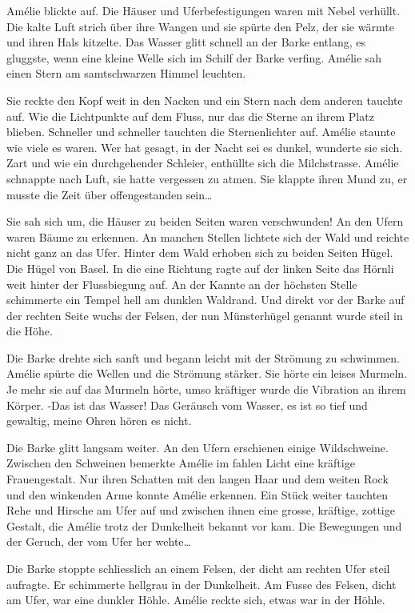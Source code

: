 \documentclass[11pt,titlepage,a5paper]{book}
\begin{document}
Amélie blickte auf. Die Häuser und Uferbefestigungen waren mit Nebel verhüllt. Die kalte Luft strich über ihre Wangen und sie spürte den Pelz, der sie wärmte und ihren Hals kitzelte. Das Wasser glitt schnell an der Barke entlang, es gluggste, wenn eine kleine Welle sich im Schilf der Barke verfing. Amélie sah einen Stern am samtschwarzen Himmel leuchten. 

Sie reckte den Kopf weit in den Nacken und ein Stern nach dem anderen tauchte auf. Wie die Lichtpunkte auf dem Fluss, nur das die Sterne an ihrem Platz blieben. Schneller und schneller tauchten die Sternenlichter auf. Amélie staunte wie viele es waren. Wer hat gesagt, in der Nacht sei es dunkel, wunderte sie sich. Zart und wie ein durchgehender Schleier, enthüllte sich die Milchstrasse. Amélie schnappte nach Luft, sie hatte vergessen zu atmen. Sie klappte ihren Mund zu, er musste die Zeit über offengestanden sein\dots 

Sie sah sich um, die Häuser zu beiden Seiten waren verschwunden! An den Ufern waren Bäume zu erkennen. An manchen Stellen lichtete sich der Wald und reichte nicht ganz an das Ufer. Hinter dem Wald erhoben sich zu beiden Seiten Hügel. Die Hügel von Basel. In die eine Richtung ragte auf der linken Seite das Hörnli weit hinter der Flussbiegung auf. An der Kannte an der höchsten Stelle schimmerte ein Tempel hell am dunklen Waldrand. Und direkt vor der Barke auf der rechten Seite wuchs der Felsen, der nun Münsterhügel genannt wurde steil in die Höhe.

Die Barke drehte sich sanft und begann leicht mit der Strömung zu schwimmen. Amélie spürte die Wellen und die Strömung stärker. Sie hörte ein leises Murmeln. Je mehr sie auf das Murmeln hörte, umso kräftiger wurde die Vibration an ihrem Körper. -Das ist das Wasser! Das Geräusch vom Wasser, es ist so tief und gewaltig, meine Ohren hören es nicht. 

Die Barke glitt langsam weiter. An den Ufern erschienen einige Wildschweine. Zwischen den Schweinen bemerkte Amélie im fahlen Licht eine kräftige Frauengestalt. Nur ihren Schatten mit den langen Haar und dem weiten Rock und den winkenden Arme konnte Amélie erkennen. Ein Stück weiter tauchten Rehe und Hirsche am Ufer auf und zwischen ihnen eine grosse, kräftige, zottige Gestalt, die Amélie trotz der Dunkelheit bekannt vor kam. Die Bewegungen und der Geruch, der vom Ufer her wehte\dots 

Die Barke stoppte schliesslich an einem Felsen, der dicht am rechten Ufer steil aufragte. Er schimmerte hellgrau in der Dunkelheit. Am Fusse des Felsen, dicht am Ufer, war eine dunkler Höhle. Amélie reckte sich, etwas war in der Höhle.
\end{document}
